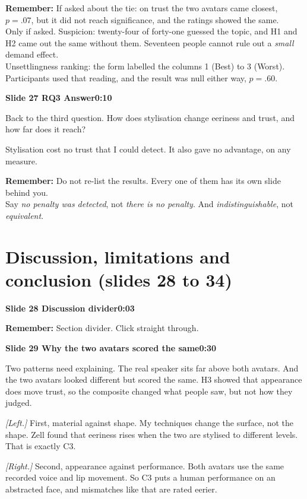 \documentclass[11pt,a4paper]{article}
\newcommand{\slidehead}[3]{%
  \needspace{5\baselineskip}
  \vspace{0.9em}
  \noindent\colorbox{knblue}{\parbox{0.978\textwidth}{\vspace{1pt}\color{white}\textbf{Slide #1 \quad #2}\hfill\textbf{#3}\vspace{1pt}}}
  \vspace{0.35em}\par}
\newcommand{\remind}[1]{%
  \vspace{0.15em}
  \noindent\colorbox{knlight}{\parbox{0.972\textwidth}{\small\color{knblue}\textbf{Remember:} #1}}
  \vspace{0.2em}\par}
\newcommand{\pointto}[1]{{\color{knaccent}\textit{[#1]}}}
\begin{document}
\remind{If asked about the tie: on trust the two avatars came closest, $p=.07$, but it did not reach significance, and the ratings showed the same.\\[0.4em] Only if asked. Suspicion: twenty-four of forty-one guessed the topic, and H1 and H2 came out the same without them. Seventeen people cannot rule out a \emph{small} demand effect.\\[0.4em] Unsettlingness ranking: the form labelled the columns 1 (Best) to 3 (Worst). Participants used that reading, and the result was null either way, $p=.60$.}

\slidehead{27}{RQ3 Answer}{0:10}

Back to the third question. How does stylisation change eeriness and trust, and how far does it reach?

Stylisation cost no trust that I could detect. It also gave no advantage, on any measure.

\remind{Do not re-list the results. Every one of them has its own slide behind you.\\[0.4em] Say \emph{no penalty was detected}, not \emph{there is no penalty}. And \emph{indistinguishable}, not \emph{equivalent}.}

\section*{\color{knblue}Discussion, limitations and conclusion (slides 28 to 34)}

\slidehead{28}{Discussion divider}{0:03}

\remind{Section divider. Click straight through.}

\slidehead{29}{Why the two avatars scored the same}{0:30}

Two patterns need explaining. The real speaker sits far above both avatars. And the two avatars looked different but scored the same. H3 showed that appearance does move trust, so the composite changed what people saw, but not how they judged.

\pointto{Left.} First, material against shape. My techniques change the surface, not the shape. Zell found that eeriness rises when the two are stylised to different levels. That is exactly C3.

\pointto{Right.} Second, appearance against performance. Both avatars use the same recorded voice and lip movement. So C3 puts a human performance on an abstracted face, and mismatches like that are rated eerier.
\end{document}
